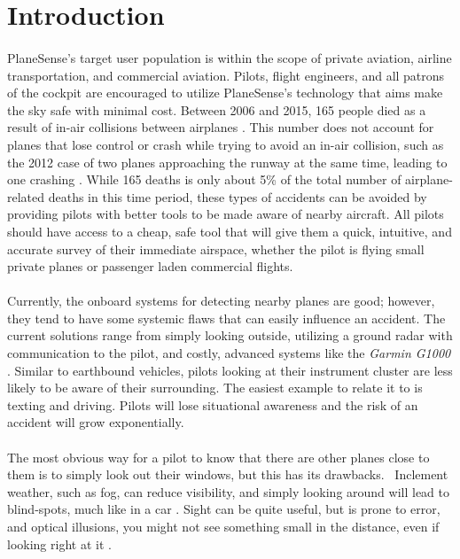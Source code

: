 \section{Introduction}
\paragraph{}
PlaneSense's target user population is within the scope of private aviation, airline transportation, and commercial aviation. Pilots, flight engineers, and all patrons of the cockpit are encouraged to utilize PlaneSense's technology that aims make the sky safe with minimal cost.  Between 2006 and 2015, 165 people died as a result of in-air collisions between airplanes \cite{Boeing}.  This number does not account for planes that lose control or crash while trying to avoid an in-air collision, such as the 2012 case of two planes approaching the runway at the same time, leading to one crashing \cite{brevard}.  While 165 deaths is only about 5\% of the total number of airplane-related deaths in this time period, these types of accidents can be avoided by providing pilots with better tools to be made aware of nearby aircraft.  All pilots should have access to a cheap, safe tool that will give them a quick, intuitive, and accurate survey of their immediate airspace, whether the pilot is flying small private planes or passenger laden commercial flights.


\paragraph{}
Currently, the onboard systems for detecting nearby planes are good; however, they tend to have some systemic flaws that can easily influence an accident. The current solutions range from simply looking outside, utilizing a ground radar with communication to the pilot, and costly, advanced systems like the \textit{Garmin G1000} \cite{Garmin}. Similar to earthbound vehicles, pilots looking at their instrument cluster are less likely to be aware of their surrounding. The easiest example to relate it to is texting and driving. Pilots will lose situational awareness and the risk of an accident will grow exponentially.


\paragraph{}
The most obvious way for a pilot to know that there are other planes close to them is to simply look out their windows, but this has its drawbacks.  Inclement weather, such as fog, can reduce visibility, and simply looking around will lead to blind-spots, much like in a car \cite{LAX06LA056B}. Sight can be quite useful, but is prone to error, and optical illusions, you might not see something small in the distance, even if looking right at it \cite{Ken}. 


